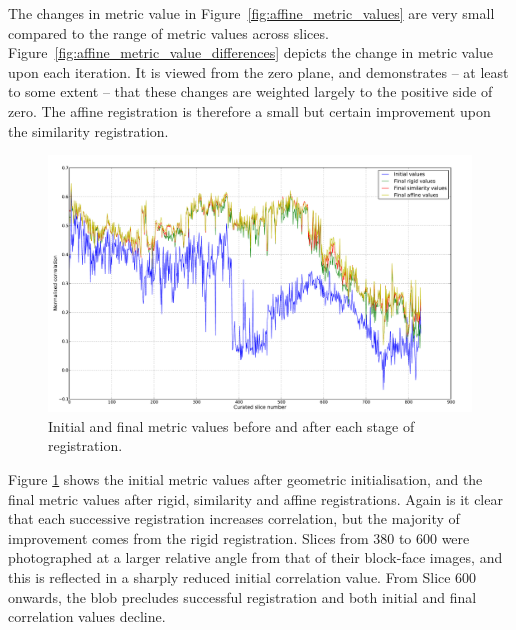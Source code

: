 	The changes in metric value in Figure~\ref{fig:affine_metric_values} are very small compared to the range of metric values across slices. Figure~\ref{fig:affine_metric_value_differences} depicts the change in metric value upon each iteration. It is viewed from the zero plane, and demonstrates -- at least to some extent -- that these changes are weighted largely to the positive side of zero. The affine registration is therefore a small but certain improvement upon the similarity registration.
	
  \begin{figure}
    \centering
    \includegraphics[width=\textheight]{Ch5/Figs/diagnostics/initial_and_final_values_comparison}
    \caption{Initial and final metric values before and after each stage of registration.}
    \label{fig:initial_and_final_values_comparison}
  \end{figure}
  
	Figure \ref{fig:initial_and_final_values_comparison} shows the initial metric values after geometric initialisation, and the final metric values after rigid, similarity and affine registrations. Again is it clear that each successive registration increases correlation, but the majority of improvement comes from the rigid registration. Slices from 380 to 600 were photographed at a larger relative angle from that of their block-face images, and this is reflected in a sharply reduced initial correlation value. From Slice 600 onwards, the blob precludes successful registration and both initial and final correlation values decline.
	
